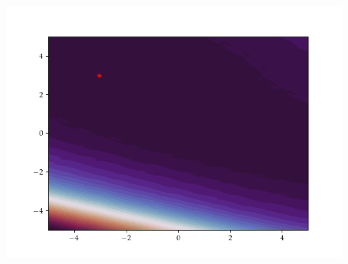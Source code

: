 \begin{figure}[h]
\begin{minipage}[b]{0.32\textwidth}
      \includegraphics[trim=2.5cm 1.3cm 2.5cm 1.3cm,clip,width=\textwidth]{Figures/coco/f15.png}
    \end{minipage}
    

\end{figure}
